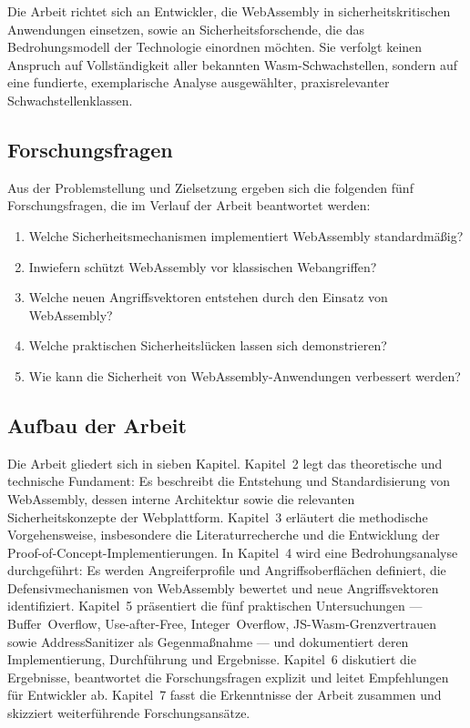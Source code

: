 Die Arbeit richtet sich an Entwickler, die WebAssembly in sicherheitskritischen Anwendungen einsetzen, sowie an Sicherheitsforschende, die das Bedrohungsmodell der Technologie einordnen möchten. Sie verfolgt keinen Anspruch auf Vollständigkeit aller bekannten Wasm-Schwachstellen, sondern auf eine fundierte, exemplarische Analyse ausgewählter, praxisrelevanter Schwachstellenklassen.

\subsection{Forschungsfragen}

Aus der Problemstellung und Zielsetzung ergeben sich die folgenden fünf Forschungsfragen, die im Verlauf der Arbeit beantwortet werden:

\begin{enumerate}
  \item Welche Sicherheitsmechanismen implementiert WebAssembly standardmäßig?
  \item Inwiefern schützt WebAssembly vor klassischen Webangriffen?
  \item Welche neuen Angriffsvektoren entstehen durch den Einsatz von WebAssembly?
  \item Welche praktischen Sicherheitslücken lassen sich demonstrieren?
  \item Wie kann die Sicherheit von WebAssembly-Anwendungen verbessert werden?
\end{enumerate}

\subsection{Aufbau der Arbeit}

Die Arbeit gliedert sich in sieben Kapitel. Kapitel~2 legt das theoretische und technische Fundament: Es beschreibt die Entstehung und Standardisierung von WebAssembly, dessen interne Architektur sowie die relevanten Sicherheitskonzepte der Webplattform. Kapitel~3 erläutert die methodische Vorgehensweise, insbesondere die Literaturrecherche und die Entwicklung der Proof-of-Concept-Implementierungen. In Kapitel~4 wird eine Bedrohungsanalyse durchgeführt: Es werden Angreiferprofile und Angriffsoberflächen definiert, die Defensivmechanismen von WebAssembly bewertet und neue Angriffsvektoren identifiziert. Kapitel~5 präsentiert die fünf praktischen Untersuchungen --- Buffer~Overflow, Use-after-Free, Integer~Overflow, JS-Wasm-Grenzvertrauen sowie AddressSanitizer als Gegenmaßnahme --- und dokumentiert deren Implementierung, Durchführung und Ergebnisse. Kapitel~6 diskutiert die Ergebnisse, beantwortet die Forschungsfragen explizit und leitet Empfehlungen für Entwickler ab. Kapitel~7 fasst die Erkenntnisse der Arbeit zusammen und skizziert weiterführende Forschungsansätze.

